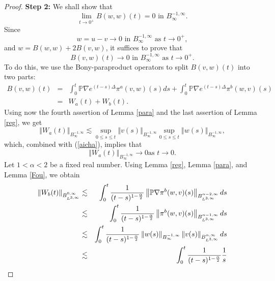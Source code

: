 \documentclass[10pt,a4paper]{amsart}
\begin{document}
\begin{proof}
\par\noindent\textbf{Step 2:} We shall  show that
\begin{equation} \label{claim1}
\lim_{t\to 0^+} B(w,w)(t)=0  \text{ in } B_{\infty }^{-1,\infty }.
\end{equation}
Since
\begin{equation}\label{aicha}
w=u-v\to 0 \text{ in } B_{\infty }^{-1,\infty } \text{ as } t\to 0^+,
\end{equation}
and $w=B(w,w)+2B(v,w)$, it suffices to prove that
\begin{equation}\label{claim}
B(v,w)(t)\to 0  \text{ in } B_{\infty }^{-1,\infty } \text{ as } t\to 0^+   .
\end{equation}
To do this, we use  the Bony-paraproduct operators to split $B(v,w)(t)$ into two parts:
\begin{eqnarray*}
B(v,w)(t) &=&\int_{0}^{t}\mathbb{P}\nabla e^{(t-s)\Delta }\pi
^{a}(v,w)(s)ds+\int_{0}^{t}\mathbb{P}\nabla e^{(t-s)\Delta }\pi ^{b}(w,v)(s)
\\
&=&W_a(t)+W_{b}(t).
\end{eqnarray*}%
Using now the fourth assertion of Lemma \ref{para} and the last assertion of Lemma \ref{reg}, we get
\[
\left\Vert W_a(t)\right\Vert _{B_{\infty }^{-1,\infty }}\lesssim
\sup_{0\leq s\leq t}\left\Vert v(s)\right\Vert _{B_{\infty }^{-1,\infty
}}\sup_{0\leq s\leq t}\left\Vert w(s)\right\Vert _{B_{\infty }^{-1,\infty
}},
\]%
which, combined with (\ref{aicha}),  implies that
\begin{equation}\label{claim2}
\left\Vert W_a(t)\right\Vert _{B_{\infty }^{-1,\infty }}\rightarrow 0\text{
as }t\rightarrow 0.
\end{equation}
Let $1<\alpha <2$ be a fixed real number. Using  Lemma \ref{reg}, Lemma \ref{para}, and Lemma \ref{Fou}, we obtain
\begin{eqnarray*}
\left\Vert W_{b}(t)\right\Vert _{B_{L^{3,\infty }}^{0,\infty }} &\lesssim
&\int_{0}^{t}\frac{1}{(t-s)^{1-\frac{\alpha }{2}}}\left\Vert \mathbb{P}%
\nabla \pi ^{b}(w,v)(s)\right\Vert _{B_{L^{3,\infty }}^{\alpha -2,\infty }}ds
\\
&\lesssim &\int_{0}^{t}\frac{1}{(t-s)^{1-\frac{\alpha }{2}}}\left\Vert \pi ^{b}(w,v)(s)\right\Vert _{B_{L^{3,\infty }}^{\alpha -1,\infty }}ds \\
&\lesssim &\int_{0}^{t}\frac{1}{(t-s)^{1-\frac{\alpha }{2}}}\left\Vert
w(s)\right\Vert _{B_{\infty }^{-1,\infty }}\left\Vert
v(s)\right\Vert _{B_{L^{3,\infty }}^{\alpha ,\infty }}ds \\
&\lesssim &\int_{0}^{t}\frac{1}{(t-s)^{1-\frac{\alpha }{2}}}\frac{1}{s^{%
}}
\end{eqnarray*}
\end{proof}
\end{document}
